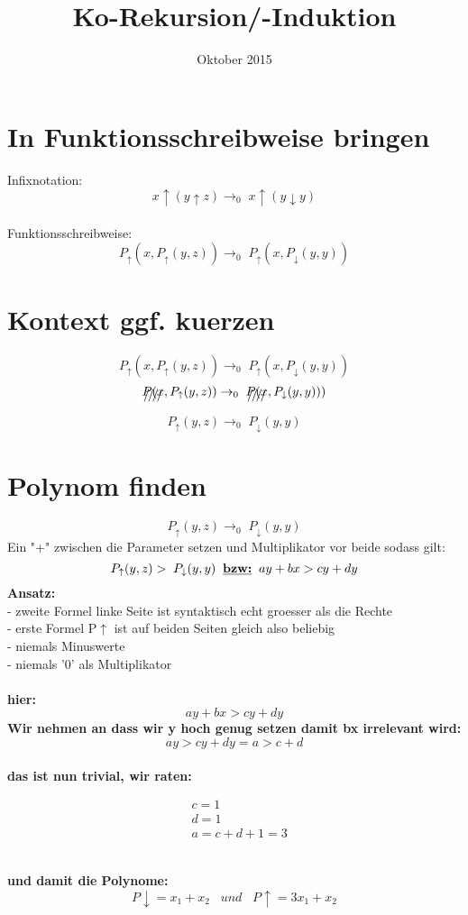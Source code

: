 \documentclass{article}
\title{Ko-Rekursion/-Induktion}
\date{Oktober 2015}
\begin{document}
	\maketitle
	\section{In Funktionsschreibweise bringen}
	Infixnotation:
	\[x \uparrow ( y \uparrow z) \rightarrow_{0}\; x \uparrow (y \downarrow y)\]\\
	Funktionsschreibweise:
	\[ P_{\uparrow}(x,P_{\uparrow}(y,z)) \rightarrow_{0} \; P_{\uparrow}(x,P_{\downarrow}(y,y))\]
	\section{Kontext ggf. kuerzen}
	\[ P_{\uparrow}(x,P_{\uparrow}(y,z)) \rightarrow_{0} \; P_{\uparrow}(x,P_{\downarrow}(y,y))\]
	\[\xout{P(x},P_{\uparrow}(y,z)) \rightarrow_{0} \; \xout{P(x},P_{\downarrow}(y,y)))\]
	\[P_{\uparrow}(y,z) \rightarrow_{0} \;P_{\downarrow}(y,y)\]
	\section{Polynom finden}
	\[P_{\uparrow}(y,z) \rightarrow_{0} \;P_{\downarrow}(y,y)\]
	Ein "+" zwischen die Parameter setzen und Multiplikator vor beide sodass gilt:
	\[P_{\uparrow}(y,z) > \;P_{\downarrow}(y,y)\;\;\textbf{\underline{bzw:}}\;\;ay+bx>cy+dy\]
	\textbf{Ansatz:}\\
	- zweite Formel linke Seite ist syntaktisch echt groesser als die Rechte\\
	- erste Formel P$\uparrow$ ist auf beiden Seiten gleich also beliebig \\
	- niemals Minuswerte \\
	- niemals '0' als Multiplikator\\\\
	\textbf{hier:}
		\[ay+bx>cy+dy\]
	\textbf{Wir nehmen an dass wir y hoch genug setzen damit bx irrelevant wird:}\\
		\[ay>cy+dy = a>c+d \]
	\\ \textbf{das ist nun trivial, wir raten:}
	\begin{fleqn}
		\begin{align*}
			&c = 1 \\
			&d = 1 \\
			&a = c+d+1 = 3
		\end{align*}
	\end{fleqn} \\
	\textbf{und damit die Polynome:}\\
	\[P\downarrow = x_1+x_2 \;\;\; und \;\;\; P\uparrow = 3x_1+x_2 \] \\
\end{document}
